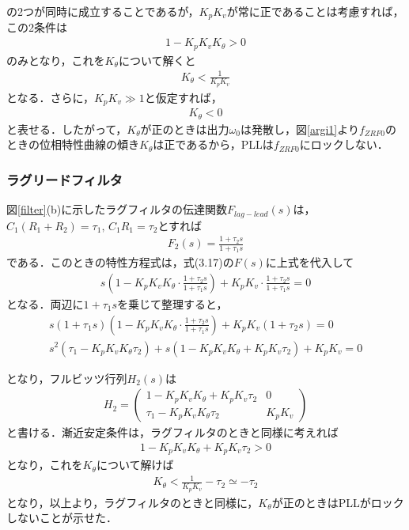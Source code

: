 の2つが同時に成立することであるが，$K_pK_v$が常に正であることは考慮すれば，この2条件は
\begin{align}
1-K_pK_vK_\theta>0
\end{align}
のみとなり，これを$K_\theta$について解くと
\begin{align}
K_\theta<\frac{1}{K_pK_v}
\end{align}
となる．さらに，$K_pK_v \gg 1$と仮定すれば，
\begin{align}
K_\theta<0
\end{align}
と表せる．したがって，$K_\theta$が正のときは出力$\omega_0$は発散し，図\ref{argi1}より$f_{ZRF0}$のときの位相特性曲線の傾き$K_\theta$は正であるから，PLLは$f_{ZRF0}$にロックしない．

\subsubsection{ラグリードフィルタ}
図\ref{filter}(b)に示したラグフィルタの伝達関数$F_{lag-lead}(s)$は，$C_1(R_1+R_2)=\tau_1, \, C_1R_1=\tau_2$とすれば
\begin{align}
F_2(s)=\frac{1+\tau_2 s}{1+\tau_1 s}
\end{align}
である．このときの特性方程式は，式(3.17)の$F(s)$に上式を代入して
\begin{align}
s \left(1-K_pK_vK_\theta \cdot \frac{1+\tau_2 s}{1+\tau_1 s} \right) + K_pK_v \cdot \frac{1+\tau_2 s}{1+\tau_1 s}=0
\end{align}
となる．両辺に$1+\tau_1 s$を乗じて整理すると，
\begin{align*}
s(1+\tau_1 s)\left(1-K_pK_vK_\theta \cdot \frac{1+\tau_2 s}{1+\tau_1 s} \right)+K_pK_v(1+\tau_2 s)=0 \\ 
s^2(\tau_1-K_pK_vK_\theta \tau_2)+s(1-K_pK_vK_\theta+K_pK_v\tau_2)+K_pK_v=0
\end{align*}

となり，フルビッツ行列$H_2(s)$は
\begin{align}
H_2=
\begin{pmatrix}
1-K_pK_vK_\theta+K_pK_v\tau_2 & 0 \\
\tau_1-K_pK_vK_\theta \tau_2 & K_pK_v
\end{pmatrix}
\end{align}
と書ける．漸近安定条件は，ラグフィルタのときと同様に考えれば
\begin{align}
1-K_pK_vK_\theta+K_pK_v\tau_2>0
\end{align}
となり，これを$K_\theta$について解けば
\begin{align}
K_\theta<\frac{1}{K_pK_v}-\tau_2 \simeq -\tau_2
\end{align}
となり，以上より，ラグフィルタのときと同様に，$K_\theta$が正のときはPLLがロックしないことが示せた．

